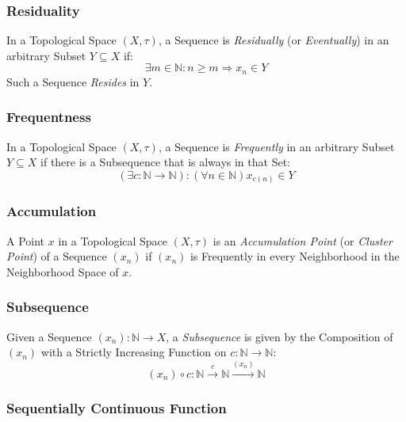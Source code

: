 \subsubsection{Residuality}\label{sec:reside}

In a Topological Space $(X, \tau)$, a Sequence is \emph{Residually}
(or \emph{Eventually}) in an arbitrary Subset $Y \subseteq X$ if:
\[
  \exists m \in \mathbb{N} : n \geq m \Rightarrow x_n \in Y
\]
Such a Sequence \emph{Resides} in $Y$.



\subsubsection{Frequentness}\label{sec:frequent}

In a Topological Space $(X, \tau)$, a Sequence is \emph{Frequently}
in an arbitrary Subset $Y \subseteq X$ if there is a Subsequence that
is always in that Set:
\[
  (\exists c : \mathbb{N} \rightarrow \mathbb{N})
  : (\forall n \in \mathbb{N}) x_{c(n)} \in Y
\]



\subsubsection{Accumulation}\label{sec:accumulation}

A Point $x$ in a Topological Space $(X, \tau)$ is an
\emph{Accumulation Point} (or \emph{Cluster Point}) of a Sequence
$(x_n)$ if $(x_n)$ is Frequently in every Neighborhood in the
Neighborhood Space of $x$.



\subsubsection{Subsequence}\label{sec:subsequence_topology}

Given a Sequence $(x_n) : \mathbb{N} \rightarrow X$, a
\emph{Subsequence} is given by the Composition of $(x_n)$ with a
Strictly Increasing Function on $c : \mathbb{N} \rightarrow
\mathbb{N}$:
\[
  (x_n) \circ c :
  \mathbb{N} \xrightarrow{c} \mathbb{N} \xrightarrow{(x_n)} \mathbb{N}
\]



\subsubsection{Sequentially Continuous Function}
\label{sec:sequentially_continuous}

